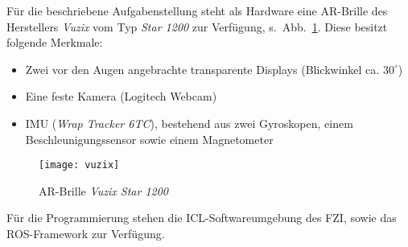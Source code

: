 Für die beschriebene Aufgabenstellung steht als Hardware eine \ac{AR}-Brille des Herstellers \emph{Vuzix} vom Typ \emph{Star 1200} zur Verfügung, s.~Abb.~\ref{fig:vuzix_star_1200}.
Diese besitzt folgende Merkmale:
\begin{itemize}
  \item Zwei vor den Augen angebrachte transparente Displays (Blickwinkel ca. $30^\circ$)
  \item Eine feste Kamera (Logitech Webcam)
  \item \ac{IMU} (\emph{Wrap Tracker 6TC}), bestehend aus zwei Gyroskopen, einem Beschleunigungssensor sowie einem Magnetometer
\end{itemize}

\begin{figure}[h]
  \centering
  \texttt{[image: vuzix]}
  \caption{\ac{AR}-Brille \emph{Vuzix Star 1200}\ \cite{vuzix}}
  \label{fig:vuzix_star_1200}
\end{figure}

Für die Programmierung stehen die \ac{ICL}-Softwareumgebung des \ac{FZI}, sowie das \ac{ROS}-Framework \cite{ros} zur Verfügung.
